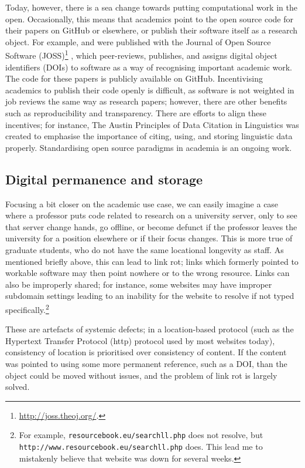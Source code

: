 Today, however, there is a sea change towards putting computational work in the open. Occasionally, this means that academics point to the open source code for their papers on GitHub or elsewhere, or publish their software itself as a research object. For example, \citet{makela2016integrated} and \citet{kleinberg2017web} were published with the Journal of Open Source Software (JOSS)\footnote{\href{http://joss.theoj.org/}{http://joss.theoj.org/}. } \citep{smith2018journal}, which peer-reviews, publishes, and assigns digital object identifiers (DOIs) to software as a way of recognising important academic work. The code for these papers is publicly available on GitHub. Incentivising academics to publish their code openly is difficult, as software is not weighted in job reviews the same way as research papers; however, there are other benefits such as reproducibility and transparency. There are efforts to align these incentives; for instance, The Austin Principles of Data Citation in Linguistics \citep{AustinPrinciples2017} was created to emphasise the importance of citing, using, and storing linguistic data properly. Standardising open source paradigms in academia is an ongoing work.

\subsection{Digital permanence and storage}
\label{subsec:digital-permanence}

Focusing a bit closer on the academic use case, we can easily imagine a case where a professor puts code related to research on a university server, only to see that server change hands, go offline, or become defunct if the professor leaves the university for a position elsewhere or if their focus changes. This is more true of graduate students, who do not have the same locational longevity as staff. As mentioned briefly above, this can lead to link rot; links which formerly pointed to workable software may then point nowhere or to the wrong resource. Links can also be improperly shared; for instance, some websites may have improper subdomain settings leading to an inability for the website to resolve if not typed specifically.\footnote{For example, {\tt resourcebook.eu/searchll.php} does not resolve, but {\tt http://www.resourcebook.eu/searchll.php} does. This lead me to mistakenly believe that  website was down for several weeks.}

These are artefacts of systemic defects; in a location-based protocol (such as the Hypertext Transfer Protocol (http) protocol used by most websites today), consistency of location is prioritised over consistency of content. If the content was pointed to using some more permanent reference, such as a DOI, than the object could be moved without issues, and the problem of link rot is largely solved.

